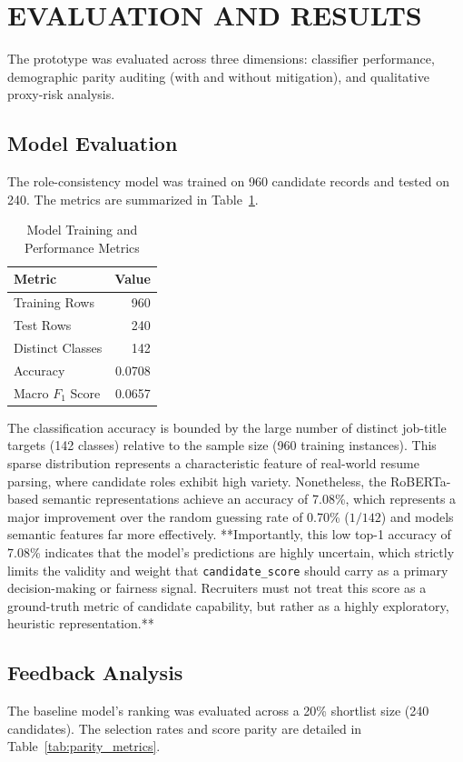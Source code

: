 \documentclass[sigconf]{acmart}
\begin{document}
\section{EVALUATION AND RESULTS}
The prototype was evaluated across three dimensions: classifier performance, demographic parity auditing (with and without mitigation), and qualitative proxy-risk analysis.
\subsection{Model Evaluation}
The role-consistency model was trained on 960 candidate records and tested on 240. The metrics are summarized in Table~\ref{tab:model_metrics}.

\begin{table}[h]
\centering
\caption{Model Training and Performance Metrics}
\label{tab:model_metrics}
\begin{tabular}{lr}
\toprule
\textbf{Metric} & \textbf{Value} \\
\midrule
Training Rows & 960 \\
Test Rows & 240 \\
Distinct Classes & 142 \\
Accuracy & 0.0708 \\
Macro $F_1$ Score & 0.0657 \\
\bottomrule
\end{tabular}
\end{table}

The classification accuracy is bounded by the large number of distinct job-title targets (142 classes) relative to the sample size (960 training instances). This sparse distribution represents a characteristic feature of real-world resume parsing, where candidate roles exhibit high variety. Nonetheless, the RoBERTa-based semantic representations achieve an accuracy of 7.08\%, which represents a major improvement over the random guessing rate of 0.70\% ($1/142$) and models semantic features far more effectively. **Importantly, this low top-1 accuracy of 7.08\% indicates that the model's predictions are highly uncertain, which strictly limits the validity and weight that \texttt{candidate\_score} should carry as a primary decision-making or fairness signal. Recruiters must not treat this score as a ground-truth metric of candidate capability, but rather as a highly exploratory, heuristic representation.**

\subsection{Feedback Analysis}
The baseline model's ranking was evaluated across a 20\% shortlist size (240 candidates). The selection rates and score parity are detailed in Table~\ref{tab:parity_metrics}.
\end{document}
